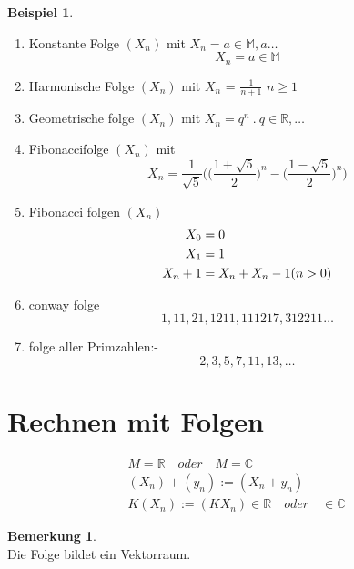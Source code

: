 \documentclass[a4paper,12pt,leqno]{report}
\theoremstyle{plain} %
\theoremstyle{definition} %
\newtheorem{remark}[theorem]{Bemerkung}
\newtheorem{example}[theorem]{Beispiel}
\begin{document}
    \begin{example}
        \[\]
        \begin{enumerate}

            \item Konstante Folge $(X_n)$ mit \quad $X_n = a \in \mathbb{M },a \dots$ \\
            \[ X_n = a \in \mathbb{M} \]
            \item Harmonische Folge $(X_n)$  mit $X_n$ =  $\frac{1}{n+1}$ \quad$ n \geq 1$
            \item Geometrische folge $(X_n)$ mit $X_n = q^n \:. \: q \in \mathbb{R}, \dots $
            \item Fibonaccifolge $(X_n)$ mit
            \[ X_n =\frac{1}{\sqrt{5}} \Big(  \big( \frac{1+ \sqrt{5}}{2} \big)^n - \big( \frac{1- \sqrt{5}}{2}\big)^n   \Big)    \]

            \item Fibonacci folgen $(X_n)$
            \begin{align}
                X_0 &=0 \notag \\X_1 &= 1 \notag \\
                X_n+1 &= X_n+X_n-1 (n>0)  \notag
            \end{align}

            \item conway  folge
            \[ 1, 11 ,21 , 1211, 111217, 312211 \dots \]

            \item folge aller Primzahlen:- \[ 2, 3 ,5 ,7 ,11, 13 , \dots \]

        \end{enumerate}
    \end{example}

    \section{Rechnen mit Folgen }
    \begin{align*}
        M  = \mathbb{R} \quad oder \quad M = \mathbb{C} \\
        (X_n)+(y_n) := (X_n+y_n)\\
        K(X_n):=(KX_n)\in \mathbb{R} \quad  oder \quad \in  \mathbb{C}
    \end{align*}
    \begin{remark}
        \[\]
        Die Folge bildet ein Vektorraum.
    \end{remark}
\end{document}
